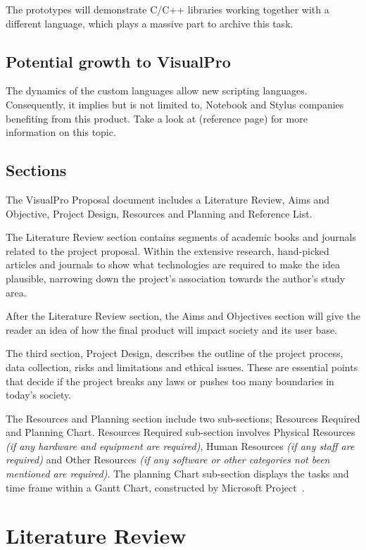 \documentclass[conference]{IEEEtran}
\begin{document}
      The prototypes will demonstrate C/C++ libraries working together with a different language, which plays a massive part to archive this task.

      \subsection{Potential growth to VisualPro}
      The dynamics of the custom languages allow new scripting languages. Consequently, it implies but is not limited to, Notebook and Stylus companies benefiting from this product. Take a look at (reference page) for more information on this topic.

      \subsection{Sections}
      The VisualPro Proposal document includes a Literature Review, Aims and Objective, Project Design, Resources and Planning and Reference List.

      The Literature Review section contains segments of academic books and journals related to the project proposal. Within the extensive research, hand-picked articles and journals to show what technologies are required to make the idea plausible, narrowing down the project's association towards the author's study area.
      
      After the Literature Review section, the Aims and Objectives section will give the reader an idea of how the final product will impact society and its user base.
      
      The third section, Project Design, describes the outline of the project process, data collection, risks and limitations and ethical issues. These are essential points that decide if the project breaks any laws or pushes too many boundaries in today's society.
      
      The Resources and Planning section include two sub-sections; Resources Required and Planning Chart. Resources Required sub-section involves Physical Resources \textit{(if any hardware and equipment are required)}, Human Resources \textit{(if any staff are required)} and Other Resources \textit{(if any software or other categories not been mentioned are required)}. The planning Chart sub-section displays the tasks and time frame within a Gantt Chart, constructed by Microsoft Project~\cite{microsoft_compare_nodate}.
    \section{Literature Review}
    \label{sec:literatureReview}
\end{document}
